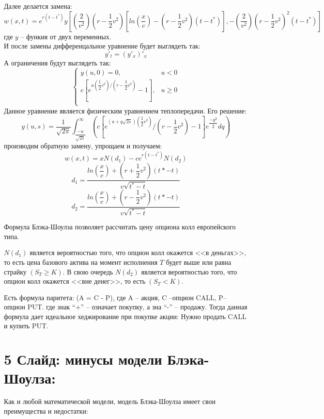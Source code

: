 \documentclass[a4paper]{article}
\begin{document}
Далее делается замена: \\
\[ w(x,t) = e^{r (t - t^*)} y \left[ \left(\frac{2}{v^2} \right) \left( r - \dfrac{1}{2} v^2\right) \left[ ln(\dfrac{x}{c}) - \left( r - \dfrac{1}{2} v^2 \right) (t - t^*) \right], - \left( \dfrac{2}{v^2} \right) \left( r - \dfrac{1}{2} v^2 \right)^2 (t - t^*) \right] \]
где $y$ -- функия от двух переменных. \\
И после замены дифференцальное уравнение будет выглядеть так:
\[y'_t = (y'_x)'_x\]
А ограничения будут выглядеть так:
\begin{equation*}
    \begin{cases}
        y(u, 0) = 0, &u < 0\\
        c \left[ e^{u \left( \dfrac{1}{2} v^2\right) / \left( r - \dfrac{1}{2} v^2\right)} - 1 \right], &u \geq 0 \\
    \end{cases}
\end{equation*}
Данное уравнение является физическим уравнением теплопередачи. Его решение:
\[y(u, s) = \dfrac{1}{\sqrt{2 \pi}} \int_{\dfrac{-u}{\sqrt{2s}}}^{\infty} \left( c \left[ e^{(u + q \sqrt{2s}) \left( \dfrac{1}{2} v^2 \right)} / \left( r - \dfrac{1}{2} v^2\right) - 1 \right] e^{\dfrac{-q^2}{2}} dq \right) \] 
производим обратную замену, упрощаем и получаем:
\[ w(x, t) = x N(d_1) - ce^{r (t - t^*)} N(d_2) \]
\[ d_1 = \dfrac{ln \left(\dfrac{x}{c} \right) + \left( r + \dfrac{1}{2} v^2 \right) (t* - t)}{v \sqrt{t^* - t}}\]
\[ d_2 = \dfrac{ln \left(\dfrac{x}{c} \right) + \left( r - \dfrac{1}{2} v^2 \right) (t* - t)}{v \sqrt{t^* - t}}\]

Формула Блэка-Шоулза позволяет рассчитать цену опциона колл европейского типа.

$N(d_1)$ является вероятностью того, что опцион колл окажется <<в деньгах>>, то есть цена базового актива на момент исполнения $T$ будет выше или равна страйку $(S_T \geq K)$. В свою очередь $N(d_2)$ является вероятностью того, что опцион колл окажется <<вне денег>>, то есть $(S_T < K)$.

Есть формула паритета: (A = C - P), где A -- акция, C --опцион CALL, P-- опцион PUT. где знак “+” -- означает покупку, а зна “-” -- продажу.
Тогда данная формула дает идеальное хеджирование при покупке акции:
Нужно продать CALL и купить PUT.

\section*{5 Слайд: минусы модели Блэка-Шоулза:}
Как и любой математической модели, модель Блэка-Шоулза имеет свои преимущества и недостатки:
\end{document}
